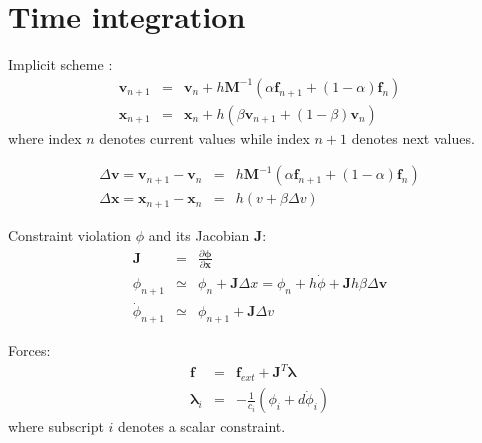 \newcommand{\vect}[1]{\mathbf{#1}}
\newcommand{\mat}[1]{\mathbf{#1}}

\newcommand{\pos}{\vect{x}}
\newcommand{\xcur}{\vect{x}_{n}}
\newcommand{\xnext}{\vect{x}_{n+1}}
\newcommand{\vel}{\vect{v}}
\newcommand{\vcur}{\vect{v}_{n}}
\newcommand{\vnext}{\vect v_{n+1}}
\newcommand{\force}{\vect{f}}
\newcommand{\forcext}{\vect{f}_{ext}}
\newcommand{\lam}{\vect{\lambda}}
\newcommand{\lcur}{\lam_{n}}
\newcommand{\lnext}{\lam_{n+1}}
\newcommand{\avlam}{\bar{\lam}}
\newcommand{\fcur}{\vect{f}_{n}}
\newcommand{\fnext}{\vect f_{n+1}}
\newcommand{\M}{\mat M}
\newcommand{\Minv}{\mat M^{-1}}
\renewcommand{\P}{\mat P}
\newcommand{\J}{\mat J}
\newcommand{\Jt}{\mat J^T}
\newcommand{\C}{\mat C}
\newcommand{\violation}{ \phi}
\newcommand{\dviolation}{\dot \violation}
\newcommand{\violcur}{\violation_{n}}
\newcommand{\violnext}{\violation_{n+1}}
\newcommand{\dviolnext}{\dot \violation_{n+1}}


\section{Time integration}
Implicit scheme :
\begin{eqnarray}
 \vnext &=& \vcur + h \Minv \left(\alpha \fnext + (1-\alpha) \fcur\right) \\
  \xnext &=& \xcur + h \left( \beta \vnext + (1-\beta) \vcur \right)
\end{eqnarray}
where index $n$ denotes current values while index $n+1$ denotes next values.

\begin{eqnarray}
 \Delta \vel = \vnext -    \vcur  &=& h \Minv \left(\alpha \fnext + (1-\alpha) \fcur\right) \\
\Delta \pos = \xnext -  \xcur    &=& h (v + \beta  \Delta v)
\end{eqnarray}

Constraint violation $\violation$ and its Jacobian $\J$:
\begin{eqnarray}
 \J &=& \frac{\partial \vect \violation}{\partial \pos} \\
 \violnext &\simeq& \violcur + \J \Delta x = \violcur + h   \dviolation + \J h \beta \Delta \vel  \label{eq violnext}\\
\dviolnext &\simeq& \violnext + \J \Delta v \label{eq dviolnext}
\end{eqnarray}


Forces:
\begin{eqnarray}
 \force &=& \forcext + \Jt \lam \\
 \lam_i &=& -\frac{1}{c_i} (  \violation_i + d \dviolation_i ) \label{eq lambda}
\end{eqnarray}
where subscript $i$ denotes a scalar constraint.

